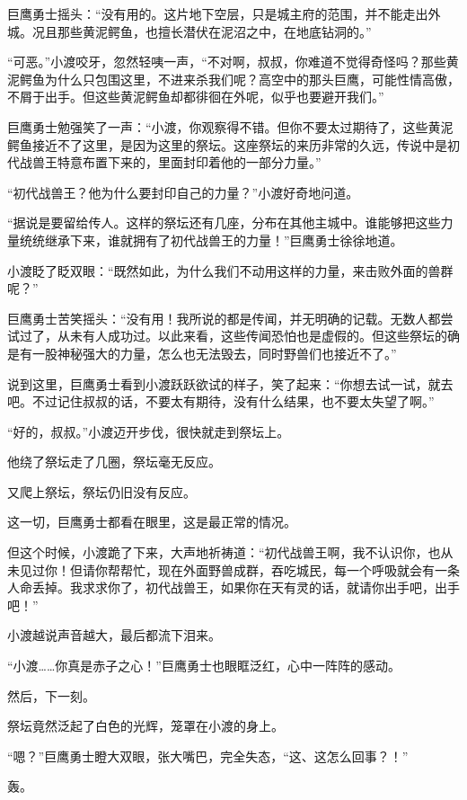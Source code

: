\begin{this_body}
巨鹰勇士摇头：“没有用的。这片地下空层，只是城主府的范围，并不能走出外城。况且那些黄泥鳄鱼，也擅长潜伏在泥沼之中，在地底钻洞的。”

“可恶。”小渡咬牙，忽然轻咦一声，“不对啊，叔叔，你难道不觉得奇怪吗？那些黄泥鳄鱼为什么只包围这里，不进来杀我们呢？高空中的那头巨鹰，可能性情高傲，不屑于出手。但这些黄泥鳄鱼却都徘徊在外呢，似乎也要避开我们。”

巨鹰勇士勉强笑了一声：“小渡，你观察得不错。但你不要太过期待了，这些黄泥鳄鱼接近不了这里，是因为这里的祭坛。这座祭坛的来历非常的久远，传说中是初代战兽王特意布置下来的，里面封印着他的一部分力量。”

“初代战兽王？他为什么要封印自己的力量？”小渡好奇地问道。

“据说是要留给传人。这样的祭坛还有几座，分布在其他主城中。谁能够把这些力量统统继承下来，谁就拥有了初代战兽王的力量！”巨鹰勇士徐徐地道。

小渡眨了眨双眼：“既然如此，为什么我们不动用这样的力量，来击败外面的兽群呢？”

巨鹰勇士苦笑摇头：“没有用！我所说的都是传闻，并无明确的记载。无数人都尝试过了，从未有人成功过。以此来看，这些传闻恐怕也是虚假的。但这些祭坛的确是有一股神秘强大的力量，怎么也无法毁去，同时野兽们也接近不了。”

说到这里，巨鹰勇士看到小渡跃跃欲试的样子，笑了起来：“你想去试一试，就去吧。不过记住叔叔的话，不要太有期待，没有什么结果，也不要太失望了啊。”

“好的，叔叔。”小渡迈开步伐，很快就走到祭坛上。

他绕了祭坛走了几圈，祭坛毫无反应。

又爬上祭坛，祭坛仍旧没有反应。

这一切，巨鹰勇士都看在眼里，这是最正常的情况。

但这个时候，小渡跪了下来，大声地祈祷道：“初代战兽王啊，我不认识你，也从未见过你！但请你帮帮忙，现在外面野兽成群，吞吃城民，每一个呼吸就会有一条人命丢掉。我求求你了，初代战兽王，如果你在天有灵的话，就请你出手吧，出手吧！”

小渡越说声音越大，最后都流下泪来。

“小渡……你真是赤子之心！”巨鹰勇士也眼眶泛红，心中一阵阵的感动。

然后，下一刻。

祭坛竟然泛起了白色的光辉，笼罩在小渡的身上。

“嗯？”巨鹰勇士瞪大双眼，张大嘴巴，完全失态，“这、这怎么回事？！”

轰。


\end{this_body}
